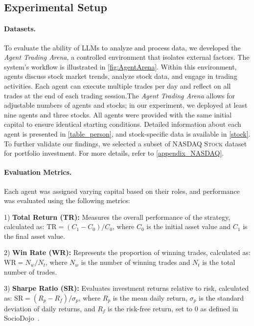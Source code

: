 \subsection{Experimental Setup}

\paragraph{Datasets.}

To evaluate the ability of LLMs to analyze and process data, we developed the \textit{Agent Trading Arena}, a controlled environment that isolates external factors. The system's workflow is illustrated in \autoref{fig:AgentArena}. Within this environment, agents discuss stock market trends, analyze stock data, and engage in trading activities. Each agent can execute multiple trades per day and reflect on all trades at the end of each trading session.The \textit{Agent Trading Arena} allows for adjustable numbers of agents and stocks; in our experiment, we deployed at least nine agents and three stocks. All agents were provided with the same initial capital to ensure identical starting conditions. Detailed information about each agent is presented in \autoref{table_person}, and stock-specific data is available in \autoref{stock}. To further validate our findings, we selected a subset of \textsc{NASDAQ Stock} dataset for portfolio investment. For more details, refer to \autoref{appendix_NASDAQ}.

\vspace{-3pt}

\paragraph{Evaluation Metrics.}

Each agent was assigned varying capital based on their roles, and performance was evaluated using the following metrics:

1) \textbf{Total Return (TR):} Measures the overall performance of the strategy, calculated as:
$\mathrm{TR} = {(C_1 - C_0)}/{C_0}$,
where $C_0$ is the initial asset value and $C_1$ is the final asset value.
	
2) \textbf{Win Rate (WR):} Represents the proportion of winning trades, calculated as:
$\mathrm{WR} = {N_w}/{N_t}$, 
where $N_w$ is the number of winning trades and $N_t$ is the total number of trades.
	
3) \textbf{Sharpe Ratio (SR):} Evaluates investment returns relative to risk, calculated as:
$\mathrm{SR} = {(R_p - R_f)}/{\sigma_p}$,
where $R_p$ is the mean daily return, $\sigma_p$ is the standard deviation of daily returns, and $R_f$ is the risk-free return, set to 0 as defined in SocioDojo~\citep{cheng2024sociodojo}.

